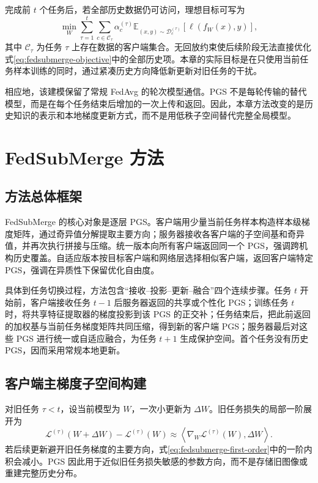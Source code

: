 完成前 $t$ 个任务后，若全部历史数据仍可访问，理想目标可写为
\begin{equation}
\min_W
\sum_{\tau=1}^{t}
\sum_{c\in\mathcal{C}_{\tau}}
\alpha_c^{(\tau)}
\mathbb{E}_{(x,y)\sim\mathcal{D}^{(\tau)}_c}
\left[\ell\!\left(f_W(x),y\right)\right],
\label{eq:fedsubmerge-objective}
\end{equation}
其中 $\mathcal{C}_{\tau}$ 为任务 $\tau$ 上存在数据的客户端集合。无回放约束使后续阶段无法直接优化式\eqref{eq:fedsubmerge-objective}中的全部历史项。本章的实际目标是在只使用当前任务样本训练的同时，通过紧凑历史方向降低新更新对旧任务的干扰。

相应地，该建模保留了常规 FedAvg 的轮次模型通信。PGS 不是每轮传输的替代模型，而是在每个任务结束后增加的一次上传和返回。因此，本章方法改变的是历史知识的表示和本地梯度更新方式，而不是用低秩子空间替代完整全局模型。

\section{FedSubMerge 方法}
\label{sec:fedsubmerge-method}

\subsection{方法总体框架}
\label{subsec:fedsubmerge-overview}

FedSubMerge 的核心对象是逐层 PGS。客户端用少量当前任务样本构造样本级梯度矩阵，通过奇异值分解提取主要方向；服务器接收各客户端的子空间基和奇异值，并再次执行拼接与压缩。统一版本向所有客户端返回同一个 PGS，强调跨机构历史覆盖。自适应版本按目标客户端和网络层选择相似客户端，返回客户端特定 PGS，强调在异质性下保留优化自由度。

具体到任务切换过程，方法包含“接收--投影--更新--融合”四个连续步骤。任务 $t$ 开始前，客户端接收任务 $t-1$ 后服务器返回的共享或个性化 PGS；训练任务 $t$ 时，将共享特征提取器的梯度投影到该 PGS 的正交补；任务结束后，把此前返回的加权基与当前任务梯度矩阵共同压缩，得到新的客户端 PGS；服务器最后对这些 PGS 进行统一或自适应融合，为任务 $t+1$ 生成保护空间。首个任务没有历史 PGS，因而采用常规本地更新。

\subsection{客户端主梯度子空间构建}
\label{subsec:fedsubmerge-client-pgs}

对旧任务 $\tau<t$，设当前模型为 $W$，一次小更新为 $\Delta W$。旧任务损失的局部一阶展开为
\begin{equation}
\mathcal{L}^{(\tau)}(W+\Delta W)
-
\mathcal{L}^{(\tau)}(W)
\approx
\left\langle
\nabla_W\mathcal{L}^{(\tau)}(W),\Delta W
\right\rangle.
\label{eq:fedsubmerge-first-order}
\end{equation}
若后续更新避开旧任务梯度的主要方向，式\eqref{eq:fedsubmerge-first-order}中的一阶内积会减小。PGS 因此用于近似旧任务损失敏感的参数方向，而不是存储旧图像或重建完整历史分布。

